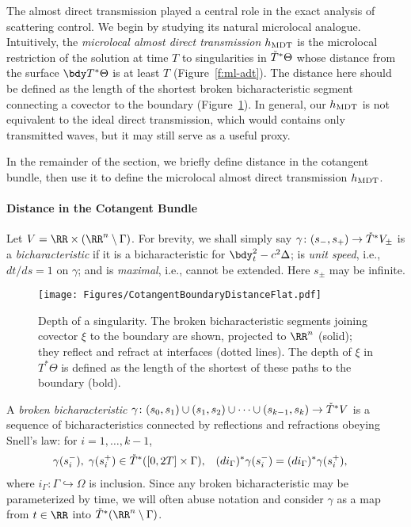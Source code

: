 \documentclass[10pt]{article}
\theoremstyle{plain}
\theoremstyle{definition}
\theoremstyle{remark}
\numberwithin{theorem}{section}
\numberwithin{example}{section}
\numberwithin{equation}{section}
\numberwithin{figure}{section}
\newcommand\To{\smash{\mathring T}\vphantom{T}}			%
\let\d\bdy 						%
\newcommand\MDT{\ensuremath{_{\text{\normalfont MDT}}}}	%
\begin{document}
The almost direct transmission played a central role in the exact analysis of scattering control. We begin by studying its natural microlocal analogue. Intuitively, the \emph{microlocal almost direct transmission} $h\MDT$ is the microlocal restriction of the solution at time $T$ to singularities in $\To^*\Theta$ whose distance from the surface $\bdy T^*\Theta$ is at least $T$ (Figure~\ref{f:ml-adt}). 
The distance here should be defined as the length of the shortest broken bicharacteristic segment connecting a covector to the boundary (Figure~\ref{f:cotangent-depth}). In general, our $h\MDT$ is not equivalent to the ideal direct transmission, which would contains only transmitted waves, but it may still serve as a useful proxy.

In the remainder of the section, we briefly define distance in the cotangent bundle, then use it to define the microlocal almost direct transmission $h\MDT$.

\paragraph{Distance in the Cotangent Bundle}

Let $V = \RR\times(\RR^n\setminus\Gamma)$.
For brevity, we shall simply say $\gamma\colon(s_-,s_+)\to \To^*V_\pm$ is a \emph{bicharacteristic} if it is a bicharacteristic for $\d_t^2-c^2\Delta$; is \emph{unit speed}, i.e., $dt/ds=1$ on $\gamma$; and is \emph{maximal}, i.e., cannot be extended. Here $s_\pm$ may be infinite.

\begin{figure}
	\centering
	\texttt{[image: Figures/CotangentBoundaryDistanceFlat.pdf]}
	
	\caption{Depth of a singularity. The broken bicharacteristic segments joining covector $\xi$ to the boundary are shown, projected to $\RR^n$ (solid); they reflect and refract at interfaces (dotted lines). The depth of $\xi$ in $T^*\Theta$ is defined as the length of the shortest of these paths to the boundary (bold).}
	\label{f:cotangent-depth}
\end{figure}

A \emph{broken bicharacteristic} $\gamma\colon(s_0,s_1)\cup(s_1,s_2)\cup\dotsb\cup(s_{k-1},s_k)\to \To^*V$ is a sequence of bicharacteristics connected by reflections and refractions obeying Snell's law: for $i=1,\dotsc,k-1$,
\begin{align}
	\gamma(s_i^-), \; \gamma(s_i^+) &\in \To^*([0,2T]\times\Gamma),
	&
	(di_\Gamma)^*\gamma(s_i^-)&=(di_\Gamma)^*\gamma(s_i^+),
	\label{e:broken-bichar-interfaces}
\end{align}
where $i_\Gamma\colon\Gamma\hookrightarrow\Omega$ is inclusion. Since any broken bicharacteristic may be parameterized by time, we will often abuse notation and consider $\gamma$ as a map from $t\in\RR$ into $\To^*\mathbf(\RR^n\setminus\Gamma)$.
\end{document}
